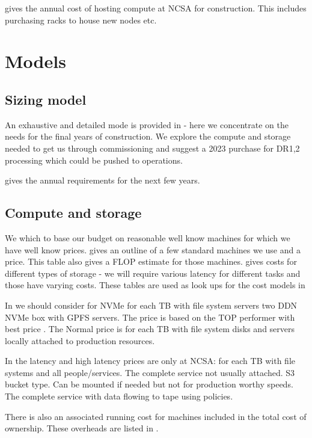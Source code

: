  gives the annual cost of hosting compute at NCSA for construction.
This includes purchasing racks to house
new nodes etc.





\section{ Models}\label{sec:model}
\subsection{Sizing model}\label{sec:sizemodel}

An exhaustive and detailed mode is provided in   - here we concentrate on the needs for the
final years of construction. We explore the compute and storage needed to get us through commissioning and suggest a 2023 purchase for DR1,2 processing which could be pushed to operations.

 gives the annual requirements for the next few years.



\subsection{Compute and storage }\label{sec:csmodel}
We which to base our budget on reasonable well know machines for which we have well know prices.
 gives an outline of a few standard machines we use and a price. This table also gives a FLOP estimate
for those machines.
 gives costs for different types of storage - we will require various latency for different tasks
and those have varying costs.
These tables are used as look ups for the cost models in 



In  we should consider for NVMe for each TB with file system servers two DDN NVMe box with GPFS servers.
The price is based on the TOP performer with best price .
The Normal price is for each TB with file system disks and servers locally attached to production resources.

In the latency and high latency prices are only at NCSA: for each TB with file systems and all people/services.
The complete service not usually attached.   S3 bucket type.
Can be mounted if needed but not for production worthy speeds.
The complete service with data flowing to tape using policies.



There is also an associated running cost for machines included in the total cost of ownership.
These overheads are listed in .




